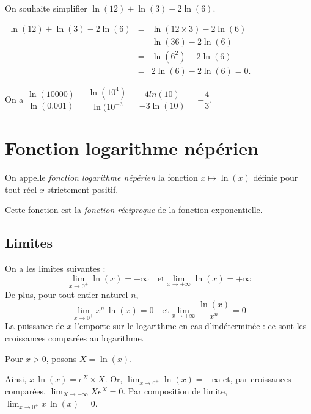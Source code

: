 \documentclass[11pt,fleqn, openany]{book} %
\begin{document}
\begin{example}On souhaite simplifier $\ln(12)+\ln(3)-2\ln(6)$.

$\begin{array}{rcl}\ln(12)+\ln(3)-2\ln(6)&=&\ln(12 \times 3)-2\ln(6)\\&=&\ln(36)-2\ln(6)\\&=&\ln(6^2)-2\ln(6)\\&=&2\ln(6)-2\ln(6)=0.\end{array}$\end{example}

\begin{example}On a $\dfrac{\ln(10000)}{\ln(0.001)}=\dfrac{\ln(10^4)}{\ln(10^{-3}}=\dfrac{4ln(10)}{-3\ln(10)}=-\dfrac{4}{3}$.\end{example}


\section{Fonction logarithme népérien}


\begin{definition}On appelle \textit{fonction logarithme népérien} la fonction $x\mapsto \ln(x)$ définie pour tout réel $x$ strictement positif.

Cette fonction est la \textit{fonction réciproque} de la fonction exponentielle.\end{definition}

\subsection{Limites}

\begin{proposition}On a les limites suivantes :
\[ \lim_{x\to 0^+}\ln(x)=-\infty \quad\text{et} \lim_{x\to +\infty} \ln(x) = +\infty \]
De plus, pour tout entier naturel $n$,
\[ \lim_{x\to 0^+}x^n\,\ln(x) = 0\quad \text{et}\lim_{x\to +\infty} \dfrac{\ln(x)}{x^n}=0\]
La puissance de $x$ l'emporte sur le logarithme en cas d'indéterminée : ce sont les croissances comparées au logarithme.\end{proposition}

\begin{demonstration}

Pour $x>0$, posons $X=\ln(x)$. 

Ainsi, $x\,\ln(x)=e^X \times X$. Or, $\displaystyle\lim_{x\to 0^+}\ln(x)=-\infty$ et, par croissances comparées, $\displaystyle\lim_{X\to -\infty}Xe^X=0$. Par composition de limite, $ \displaystyle\lim_{x\to 0^+}x\,\ln(x)=0$. \end{demonstration}
\end{document}
